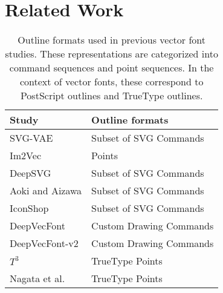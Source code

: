 \section{Related Work}
\begin{table}[!b]
    \renewcommand{\arraystretch}{1.3}
    \caption{
        \normalfont
        Outline formats used in previous vector font studies.
        These representations are categorized into command sequences and point sequences.
        In the context of vector fonts, these correspond to PostScript outlines and TrueType outlines.
    }
    \label{tab:study_outline_format}
    \centering
    \begin{tabular}{ll}
        \hline
        \textbf{Study}                              & \textbf{Outline formats} \\
        \hline
        SVG-VAE \cite{lopes2019svg}                 & Subset of SVG Commands   \\
        Im2Vec \cite{reddy2021im2vec}               & Points                   \\
        DeepSVG \cite{carlier2020deepsvg}           & Subset of SVG Commands   \\
        Aoki and Aizawa \cite{aoki2022svg}          & Subset of SVG Commands   \\
        IconShop \cite{wu2023iconshop}              & Subset of SVG Commands   \\
        DeepVecFont \cite{wang2021deepvecfont}      & Custom Drawing Commands  \\
        DeepVecFont-v2 \cite{wang2023deepvecfontv2} & Custom Drawing Commands  \\
        $T^3$ \cite{nagata2022truetype}             & TrueType Points          \\
        Nagata et al. \cite{nagata2023contour}      & TrueType Points          \\
        \hline
    \end{tabular}
\end{table}

